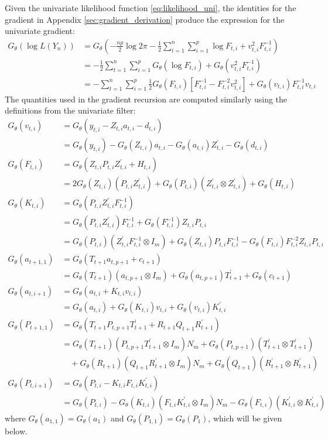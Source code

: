 \documentclass[12pt]{article}
\newcommand{\Gt}{G_\theta}
\begin{document}
	Given the univariate likelihood function \eqref{eq:likelihood_uni}, the identities for the gradient in Appendix \ref{sec:gradient_derivation} produce the expression for the univariate gradient: 
	\begin{align*}
	\Gt(\log L(Y_n)) &= \Gt \left(-\frac{np}{2} \log 2\pi - \frac{1}{2} \sum_{t=1}^n \sum_{i=1}^p \log F_{t,i}+ v_{t,i}^2 F_{t,i}^{-1}\right) \\
	&= -\frac{1}{2} \sum_{t=1}^n \sum_{i=1}^p \Gt(\log F_{t,i}) + \Gt(v_{t,i}^2 F_{t,i}^{-1}) \\
	&= - \sum_{t=1}^n \sum_{i=1}^p \frac{1}{2}  \Gt(F_{t,i}) \left[F_{t,i}^{-1} - F_{t,i}^{-2} v_{t,i}^2\right] +  \Gt(v_{t,i}) F_{t,i}^{-1} v_{t,i}
	\end{align*}
	The quantities used in the gradient recursion are computed similarly using the definitions from the univariate filter: 
	\begin{align*}
	\Gt(v_{t,i}) &= \Gt(y_{t,i} - Z_{t,i} a_{t,i} - d_{t,i}) \\
	&= \Gt(y_{t,i}) -\Gt(Z_{t,i}) a_{t,i} - \Gt(a_{t,i}) Z_{t,i}^\prime - \Gt(d_{t,i}) \\
	\Gt(F_{t,i}) &= \Gt(Z_{t,i} P_{t,i} Z_{t,i}^\prime + H_{t,i}) \\
	&= 2 \Gt(Z_{t,i})(P_{t,i} Z_{t,i}^\prime) + \Gt(P_{t,i}) (Z_{t,i}^\prime \otimes Z_{t,i}^\prime) + \Gt(H_{t,i}) \\
	\Gt(K_{t,i}) &= \Gt(P_{t,i} Z_{t,i}^\prime F_{t,i}^{-1}) \\
	&= \Gt(P_{t,i} Z_{t,i}^\prime) F_{t,i}^{-1} + \Gt(F_{t,i}^{-1}) Z_{t,i} P_{t,i} \\
	&= \Gt(P_{t,i}) (Z_{t,i}^\prime F_{t,i}^{-1} \otimes I_m) + \Gt(Z_{t,i}) P_{t,i} F_{t,i}^{-1} - \Gt(F_{t,i}) F_{t,i}^{-2} Z_{t,i} P_{t,i} \\
	\Gt(a_{t+1,1}) &= \Gt(T_{t+1} a_{t,p+1} + c_{t+1}) \\
	&= \Gt(T_{t+1}) (a_{t,p+1} \otimes I_m) + \Gt(a_{t,p+1}) T_{t+1}^\prime + \Gt(c_{t+1})\\ 
	\Gt(a_{t,i+1}) &= \Gt(a_{t,i} + K_{t,i} v_{t,i}) \\	
	&= \Gt(a_{t,i}) + \Gt(K_{t,i})v_{t,i} + \Gt(v_{t,i})K_{t,i}^\prime \\
	\Gt(P_{t+1,1}) &= \Gt(T_{t+1} P_{t,p+1} T_{t+1}^\prime + R_{t+1} Q_{t+1} R_{t+1}^\prime) \\
	&= \Gt(T_{t+1})(P_{t,p+1} T_{t+1}^\prime \otimes I_m) N_m + \Gt(P_{t,p+1})(T_{t+1}^\prime \otimes T_{t+1}^\prime) \\
	&\quad + \Gt(R_{t+1})(Q_{t+1} R_{t+1}^\prime \otimes I_m) N_m + \Gt(Q_{t+1})(R_{t+1}^\prime \otimes R_{t+1}^\prime) \\
	\Gt(P_{t,i+1}) &= \Gt(P_{t,i} - K_{t,i} F_{t,i} K_{t,i}^\prime) \\ 
	&= \Gt(P_{t,i}) - \Gt(K_{t,i})(F_{t,i}K_{t,i}^\prime \otimes I_m) N_m - \Gt(F_{t,i})(K_{t,i}^\prime \otimes K_{t,i}^\prime)
	\end{align*}
	where $\Gt(a_{1,1}) = \Gt(a_1)$ and $\Gt(P_{1,1}) = \Gt(P_1)$, which will be given below. 
\end{document}
